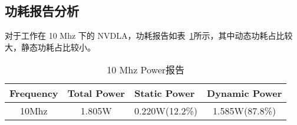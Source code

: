 \subsection{功耗报告分析}

对于工作在 10 Mhz 下的 NVDLA，功耗报告如表~\ref{tab:10Mhz Power}所示，其中动态功耗占比较大，静态功耗占比较小。

\begin{table}[!htbp]
    \caption{10 Mhz Power报告}
    \label{tab:10Mhz Power}
    \centering
    \footnotesize%
    \setlength{\tabcolsep}{4pt}%
    \renewcommand{\arraystretch}{1.2}%
    \begin{tabular}{llll}
        \toprule
        \textbf{Frequency}        & \textbf{Total Power}       & \textbf{Static Power}            & \textbf{Dynamic Power}           \\
        \midrule
        \multicolumn{1}{c}{10Mhz} & \multicolumn{1}{c}{1.805W} & \multicolumn{1}{c}{0.220W(12.2\%)} & \multicolumn{1}{c}{1.585W(87.8\%)} \\
        \bottomrule                   
    \end{tabular}
\end{table}










